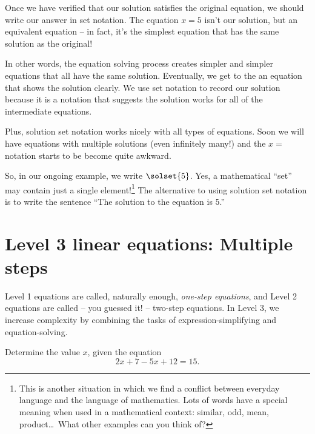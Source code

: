 Once we have verified that our solution satisfies the original equation, we should write our answer in set notation. The equation $x=5$ isn't our solution, but an equivalent equation -- in fact, it's the simplest equation that has the same solution as the original!

In other words, the equation solving process creates simpler and simpler equations that all have the same solution. Eventually, we get to the an equation that shows the solution clearly. We use set notation to record our solution because it is a notation that suggests the solution works for all of the intermediate equations.

Plus, solution set notation works nicely with all types of equations. Soon we will have equations with multiple solutions (even infinitely many!) and the $x=$ notation starts to be become quite awkward.

So, in our ongoing example, we write $\solset{5}$. Yes, a mathematical ``set'' may contain just a single element!\footnote{This is another situation in which we find a conflict between everyday language and the language of mathematics. Lots of words have a special meaning when used in a mathematical context: similar, odd, mean, product\ldots\ What other examples can you think of?} The alternative to using solution set notation is to write the sentence ``The solution to the equation is 5.''


\section{Level 3 linear equations: Multiple steps}
\label{sec:linearlevel3}

Level 1 equations are called, naturally enough, \textit{one-step equations}, and Level 2 equations are called -- you guessed it! -- two-step equations. In Level 3, we increase complexity by combining the tasks of expression-simplifying and equation-solving.

\begin{boxedexplore}
\end{boxedexplore}

\begin{boxedexplore}
Determine the value $x$, given the equation \[2x + 7 - 5x + 12 = 15.\]
\end{boxedexplore} %

